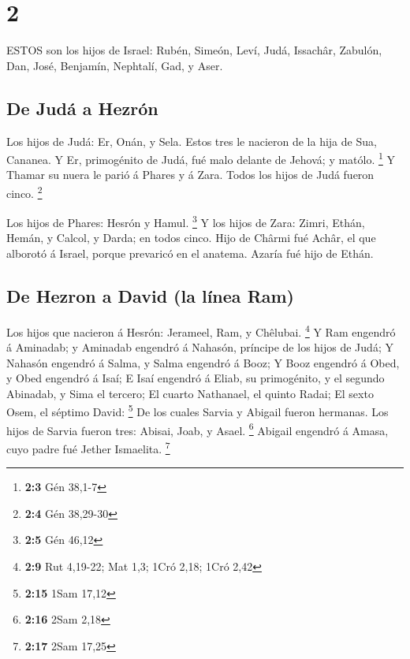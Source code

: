 \hypertarget{section-1}{%
\section{2}\label{section-1}}

 ESTOS son los hijos de Israel: Rubén, Simeón, Leví, Judá,
Issachâr, Zabulón,  Dan, José, Benjamín, Nephtalí, Gad, y
Aser.

\hypertarget{de-juduxe1-a-hezruxf3n}{%
\subsection{De Judá a Hezrón}\label{de-juduxe1-a-hezruxf3n}}

 Los hijos de Judá: Er, Onán, y Sela. Estos tres le nacieron
de la hija de Sua, Cananea. Y Er, primogénito de Judá, fué malo delante
de Jehová; y matólo. \footnote{\textbf{2:3} Gén 38,1-7}  Y
Thamar su nuera le parió á Phares y á Zara. Todos los hijos de Judá
fueron cinco. \footnote{\textbf{2:4} Gén 38,29-30}

 Los hijos de Phares: Hesrón y Hamul. \footnote{\textbf{2:5}
  Gén 46,12}  Y los hijos de Zara: Zimri, Ethán, Hemán, y
Calcol, y Darda; en todos cinco.  Hijo de Chârmi fué Achâr,
el que alborotó á Israel, porque prevaricó en el anatema. 
Azaría fué hijo de Ethán.

\hypertarget{de-hezron-a-david-la-luxednea-ram}{%
\subsection{De Hezron a David (la línea
Ram)}\label{de-hezron-a-david-la-luxednea-ram}}

 Los hijos que nacieron á Hesrón: Jerameel, Ram, y Chêlubai.
\footnote{\textbf{2:9} Rut 4,19-22; Mat 1,3; 1Cró 2,18; 1Cró 2,42}
 Y Ram engendró á Aminadab; y Aminadab engendró á Nahasón,
príncipe de los hijos de Judá;  Y Nahasón engendró á Salma,
y Salma engendró á Booz;  Y Booz engendró á Obed, y Obed
engendró á Isaí;  E Isaí engendró á Eliab, su primogénito,
y el segundo Abinadab, y Sima el tercero;  El cuarto
Nathanael, el quinto Radai;  El sexto Osem, el séptimo
David: \footnote{\textbf{2:15} 1Sam 17,12}  De los cuales
Sarvia y Abigail fueron hermanas. Los hijos de Sarvia fueron tres:
Abisai, Joab, y Asael. \footnote{\textbf{2:16} 2Sam 2,18} 
Abigail engendró á Amasa, cuyo padre fué Jether Ismaelita. \footnote{\textbf{2:17}
  2Sam 17,25}

